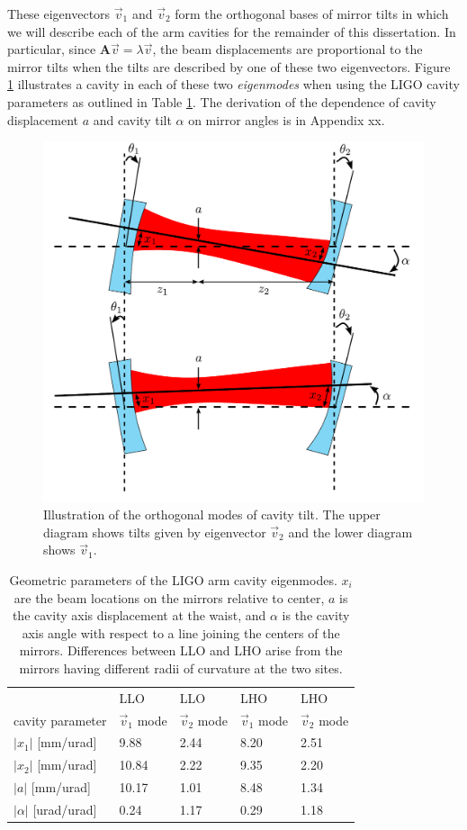 These eigenvectors $\vec{v}_1$ and $\vec{v}_2$ form the orthogonal
bases of mirror tilts in which we will describe each of the arm
cavities for the remainder of this dissertation. In particular, since
$\mathbf{A} \vec{v} = \lambda \vec{v}$, the beam displacements are
proportional to the mirror tilts when the tilts are described by one
of these two eigenvectors. Figure \ref{fig:ss} illustrates a cavity in
each of these two \emph{eigenmodes} when using the LIGO cavity parameters
as outlined in Table \ref{table:cav_geometric}. The derivation of the
dependence of cavity displacement $a$ and cavity tilt $\alpha$ on
mirror angles is in Appendix xx.


\begin{figure}
\begin{centering}
\includegraphics[width=0.6\columnwidth]{figures/eigenmodes.pdf}
\caption{Illustration of the orthogonal modes of cavity tilt. The upper diagram shows tilts given
  by eigenvector $\vec{v}_2$ and the lower diagram shows $\vec{v}_1$.} 
\label{fig:ss}
\end{centering}
\end{figure}

\begin{table}
\centering
\caption{Geometric parameters of the LIGO arm cavity
  eigenmodes. $x_i$ are the beam locations on the mirrors relative
  to center, $a$ is the cavity axis displacement at the waist, and
  $\alpha$ is the cavity axis angle with respect to a line joining the
centers of the mirrors. Differences between LLO and LHO arise from the
mirrors having different radii of curvature at the two sites.}
\begin{tabular}{l l l l l}
& LLO & LLO & LHO & LHO \\
cavity parameter & $\vec{v}_1$ mode & $\vec{v}_2$ mode & $\vec{v}_1$ mode & $\vec{v}_2$ mode \\
\hline\hline
$|x_1|$ [mm/urad]  & 9.88 & 2.44 & 8.20 & 2.51\\
$|x_2|$ [mm/urad] & 10.84 & 2.22 & 9.35 & 2.20\\
$|a|$ [mm/urad] & 10.17 & 1.01 & 8.48 & 1.34 \\
$|\alpha|$ [urad/urad] & 0.24 & 1.17 & 0.29 & 1.18 \\
\hline
\end{tabular}
\label{table:cav_geometric}
\end{table}



